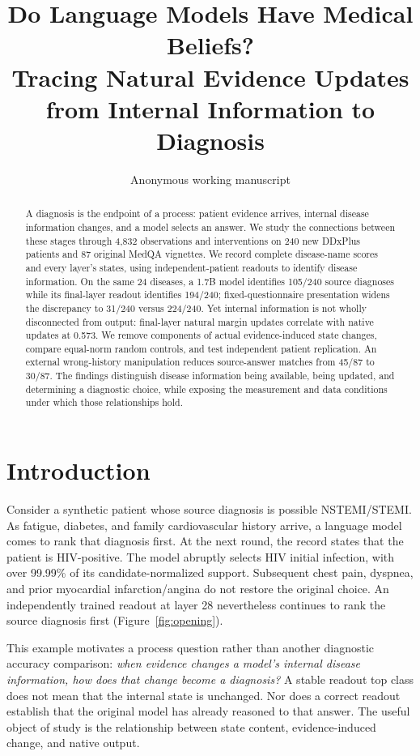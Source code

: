 \documentclass[11pt]{article}
\title{Do Language Models Have Medical Beliefs?\\Tracing Natural Evidence Updates from Internal Information to Diagnosis}
\author{Anonymous working manuscript}
\begin{document}
\maketitle
\begin{abstract}
A diagnosis is the endpoint of a process: patient evidence arrives, internal disease information changes, and a model selects an answer. We study the connections between these stages through 4,832 observations and interventions on 240 new DDxPlus patients and 87 original MedQA vignettes. We record complete disease-name scores and every layer's states, using independent-patient readouts to identify disease information. On the same 24 diseases, a 1.7B model identifies 105/240 source diagnoses while its final-layer readout identifies 194/240; fixed-questionnaire presentation widens the discrepancy to 31/240 versus 224/240. Yet internal information is not wholly disconnected from output: final-layer natural margin updates correlate with native updates at 0.573. We remove components of actual evidence-induced state changes, compare equal-norm random controls, and test independent patient replication. \CausalAbstract{} An external wrong-history manipulation reduces source-answer matches from 45/87 to 30/87. The findings distinguish disease information being available, being updated, and determining a diagnostic choice, while exposing the measurement and data conditions under which those relationships hold.
\end{abstract}

\section{Introduction}
Consider a synthetic patient whose source diagnosis is possible NSTEMI/STEMI. As fatigue, diabetes, and family cardiovascular history arrive, a language model comes to rank that diagnosis first. At the next round, the record states that the patient is HIV-positive. The model abruptly selects HIV initial infection, with over 99.99\% of its candidate-normalized support. Subsequent chest pain, dyspnea, and prior myocardial infarction/angina do not restore the original choice. An independently trained readout at layer 28 nevertheless continues to rank the source diagnosis first (Figure~\ref{fig:opening}).

This example motivates a process question rather than another diagnostic accuracy comparison: \emph{when evidence changes a model's internal disease information, how does that change become a diagnosis?} A stable readout top class does not mean that the internal state is unchanged. Nor does a correct readout establish that the original model has already reasoned to that answer. The useful object of study is the relationship between state content, evidence-induced change, and native output.
\end{document}

